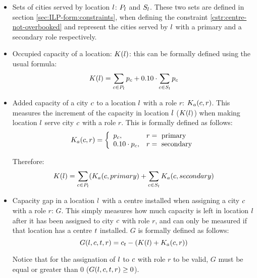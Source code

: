 \begin{itemize}
    \item Sets of cities served by location $l$: $P_l$ and $S_l$. These two sets
    are defined in section \ref{sec:ILP-form:constraints}, when defining the constraint
    \ref{cstr:centre-not-overbooked} and represent the cities served by $l$ with a
    primary and a secondary role respectively.
    
    \item Occupied capacity of a location: $K(l)$: this can be formally defined using the
    usual formula:
    \begin{equation}
    K(l) = \sum_{c \in P_l} p_c + 0.10 \cdot \sum_{c \in S_l} p_c
    \end{equation}
    
    \item Added capacity of a city $c$ to a location $l$ with a role $r$:
    $K_a(c, r)$. This measures the increment of the capacity in location $l$
    ($K(l)$) when making location $l$ serve city $c$ with a role $r$. This is
    formally defined as follows:
    \begin{equation}
    K_a(c, r) =
        \left \{
        \begin{array}{l l}
            p_c,            & r= \text{ primary} \\
            0.10 \cdot p_c, & r= \text{ secondary}
        \end{array}
        \right.
    \end{equation}
    
    Therefore:
    \[
    K(l) =  \sum_{c \in P_l} (K_a(c, primary) +
                \sum_{c \in S_l} K_a(c, secondary)
    \]
    
    \item Capacity gap in a location $l$ with a centre installed when assigning a city
    $c$ with a role $r$: $G$. This simply measures how much capacity is left in location
    $l$ after it has been assigned to city $c$ with role $r$, and can only be
    measured if that     location has a centre $t$ installed. $G$ is formally defined
    as follows:
    \begin{equation}
    G(l, c, t, r) = c_t - (K(l) + K_a(c, r))
    \end{equation}
    
    Notice that for the assignation of $l$ to $c$ with role $r$ to be valid, $G$
    must be equal or greater than 0 ($G(l, c, t, r) \ge 0$).
    
\end{itemize}


